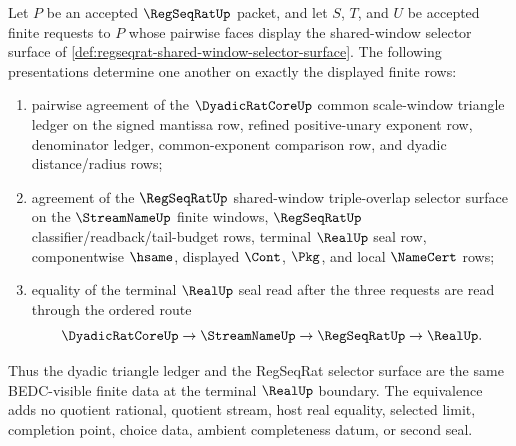 \begin{theorem}
\label{thm:regseqrat-dyadic-triangle-selector-equivalence}
Let $P$ be an accepted $\RegSeqRatUp$ packet, and let $S$, $T$, and $U$ be accepted finite requests to $P$ whose pairwise faces display the shared-window selector surface of \autoref{def:regseqrat-shared-window-selector-surface}. The following presentations determine one another on exactly the displayed finite rows:
\begin{enumerate}
\item pairwise agreement of the $\DyadicRatCoreUp$ common scale-window triangle ledger on the signed mantissa row, refined positive-unary exponent row, denominator ledger, common-exponent comparison row, and dyadic distance/radius rows;
\item agreement of the $\RegSeqRatUp$ shared-window triple-overlap selector surface on the $\StreamNameUp$ finite windows, $\RegSeqRatUp$ classifier/readback/tail-budget rows, terminal $\RealUp$ seal row, componentwise $\hsame$, displayed $\Cont$, $\Pkg$, and local $\NameCert$ rows;
\item equality of the terminal $\RealUp$ seal read after the three requests are read through the ordered route
$$
\DyadicRatCoreUp \to \StreamNameUp \to \RegSeqRatUp \to \RealUp .
$$
\end{enumerate}
Thus the dyadic triangle ledger and the RegSeqRat selector surface are the same BEDC-visible finite data at the terminal $\RealUp$ boundary. The equivalence adds no quotient rational, quotient stream, host real equality, selected limit, completion point, choice data, ambient completeness datum, or second seal.
\end{theorem}
